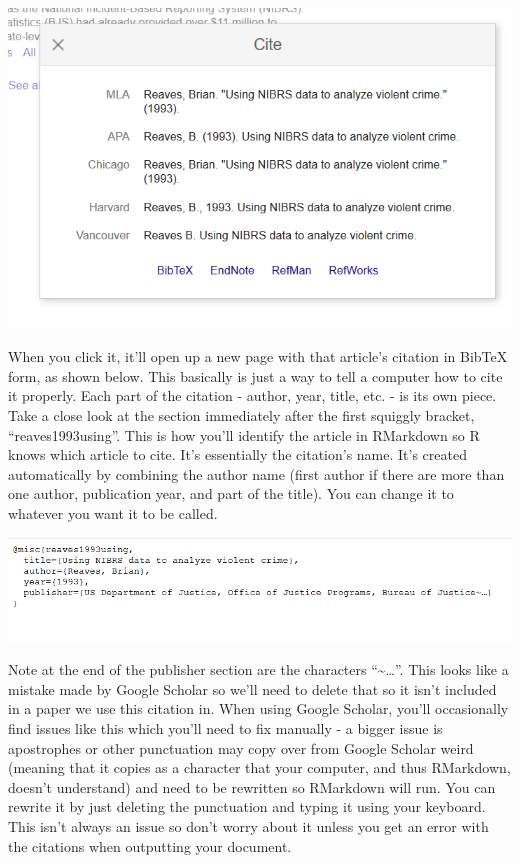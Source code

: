 \documentclass[
]{krantz}
\begin{document}
\includegraphics{images/google_scholar_cite.PNG}

When you click it, it'll open up a new page with that article's citation in BibTeX form, as shown below. This basically is just a way to tell a computer how to cite it properly. Each part of the citation - author, year, title, etc. - is its own piece. Take a close look at the section immediately after the first squiggly bracket, ``reaves1993using''. This is how you'll identify the article in RMarkdown so R knows which article to cite. It's essentially the citation's name. It's created automatically by combining the author name (first author if there are more than one author, publication year, and part of the title). You can change it to whatever you want it to be called.

\includegraphics{images/google_scholar_bibtex.PNG}

Note at the end of the publisher section are the characters ``\textasciitilde\ldots{}''. This looks like a mistake made by Google Scholar so we'll need to delete that so it isn't included in a paper we use this citation in. When using Google Scholar, you'll occasionally find issues like this which you'll need to fix manually - a bigger issue is apostrophes or other punctuation may copy over from Google Scholar weird (meaning that it copies as a character that your computer, and thus RMarkdown, doesn't understand) and need to be rewritten so RMarkdown will run. You can rewrite it by just deleting the punctuation and typing it using your keyboard. This isn't always an issue so don't worry about it unless you get an error with the citations when outputting your document.
\end{document}
